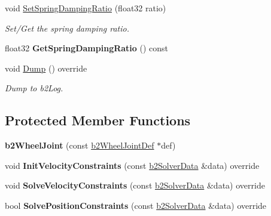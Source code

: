 \begin{DoxyCompactItemize}
void \hyperlink{classb2_wheel_joint_a39b123ac045c8ec93faa65746e6655dc}{Set\+Spring\+Damping\+Ratio} (float32 ratio)
\begin{DoxyCompactList}\small\item\em Set/\+Get the spring damping ratio. \end{DoxyCompactList}\item 
\mbox{\label{classb2_wheel_joint_a18726ad5af314531f518132d6623bc61}} 
float32 {\bfseries Get\+Spring\+Damping\+Ratio} () const
\item 
\mbox{\label{classb2_wheel_joint_a8295644bd733c28c8c9fa6390a367f3f}} 
void \hyperlink{classb2_wheel_joint_a8295644bd733c28c8c9fa6390a367f3f}{Dump} () override
\begin{DoxyCompactList}\small\item\em Dump to b2\+Log. \end{DoxyCompactList}\end{DoxyCompactItemize}
\subsection*{Protected Member Functions}
\begin{DoxyCompactItemize}
\item 
\mbox{\label{classb2_wheel_joint_a9c8bbb1068ddb46d074fe91802dd6a39}} 
{\bfseries b2\+Wheel\+Joint} (const \hyperlink{structb2_wheel_joint_def}{b2\+Wheel\+Joint\+Def} $\ast$def)
\item 
\mbox{\label{classb2_wheel_joint_a557c58a58cdf75d5b2c14c7f75a37575}} 
void {\bfseries Init\+Velocity\+Constraints} (const \hyperlink{structb2_solver_data}{b2\+Solver\+Data} \&data) override
\item 
\mbox{\label{classb2_wheel_joint_afbda202bc67d58cac38e3c5b138b93f7}} 
void {\bfseries Solve\+Velocity\+Constraints} (const \hyperlink{structb2_solver_data}{b2\+Solver\+Data} \&data) override
\item 
\mbox{\label{classb2_wheel_joint_addbe70ee831954312bc31dee1d52311f}} 
bool {\bfseries Solve\+Position\+Constraints} (const \hyperlink{structb2_solver_data}{b2\+Solver\+Data} \&data) override
\end{DoxyCompactItemize}
